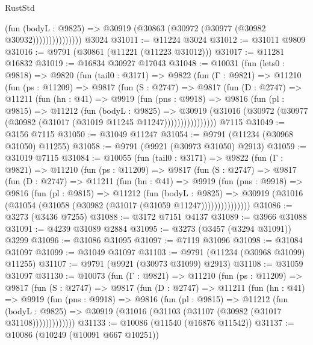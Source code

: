\begin{lexlean}{RustStd}
\begin{coremodule}
                        (fun (bodyL : @9825) =>
                        @30919 (@30863 (@30972 (@30977 (@30982 @30932)))))))))))))))
    @3024
@31011 := @11224 @3024
@31012 := @31011 @9809
@31016 := @9791 (@30861 (@11221 (@11223 @31012)))
@31017 := @11281 @16832
@31019 := @16834 @30927 @17043
@31048 := @10031
    (fun (lets0 : @9818) =>
    @9820
      (fun (tail0 : @3171) =>
      @9822
        (fun (Γ : @9821) =>
        @11210
          (fun (ps : @11209) =>
          @9817
            (fun (S : @2747) =>
            @9817
              (fun (D : @2747) =>
              @11211
                (fun (hn : @41) =>
                @9919
                  (fun (pns : @9918) =>
                  @9816
                    (fun (pl : @9815) =>
                    @11212
                      (fun (bodyL : @9825) =>
                      @30919
                        (@31016
                          (@30972 (@30977 (@30982 (@31017 (@31019 @11245 @11247))))))))))))))))
    @7115
@31049 := @3156 @7115
@31050 := @31049 @11247
@31054 := @9791 (@11234 (@30968 @31050) @11255)
@31058 := @9791 (@9921 (@30973 @31050) @2913)
@31059 := @31019 @7115
@31084 := @10055
    (fun (tail0 : @3171) =>
    @9822
      (fun (Γ : @9821) =>
      @11210
        (fun (ps : @11209) =>
        @9817
          (fun (S : @2747) =>
          @9817
            (fun (D : @2747) =>
            @11211
              (fun (hn : @41) =>
              @9919
                (fun (pns : @9918) =>
                @9816
                  (fun (pl : @9815) =>
                  @11212
                    (fun (bodyL : @9825) =>
                    @30919 (@31016 (@31054 (@31058 (@30982 (@31017 (@31059 @11247)))))))))))))))
@31086 := @3273 (@3436 @7255)
@31088 := @3172 @7151 @4137
@31089 := @3966 @31088
@31091 := @4239 @31089 @2884
@31095 := @3273 (@3457 (@3294 @31091)) @3299
@31096 := @31086 @31095
@31097 := @7119 @31096
@31098 := @31084 @31097
@31099 := @31049 @31097
@31103 := @9791 (@11234 (@30968 @31099) @11255)
@31107 := @9791 (@9921 (@30973 @31099) @2913)
@31108 := @31059 @31097
@31130 := @10073
    (fun (Γ : @9821) =>
    @11210
      (fun (ps : @11209) =>
      @9817
        (fun (S : @2747) =>
        @9817
          (fun (D : @2747) =>
          @11211
            (fun (hn : @41) =>
            @9919
              (fun (pns : @9918) =>
              @9816
                (fun (pl : @9815) =>
                @11212
                  (fun (bodyL : @9825) =>
                  @30919 (@31016 (@31103 (@31107 (@30982 (@31017 @31108)))))))))))))
@31133 := @10086 (@11540 (@16876 @11542))
@31137 := @10086 (@10249 (@10091 @667 @10251))

\end{coremodule}
\end{lexlean}
